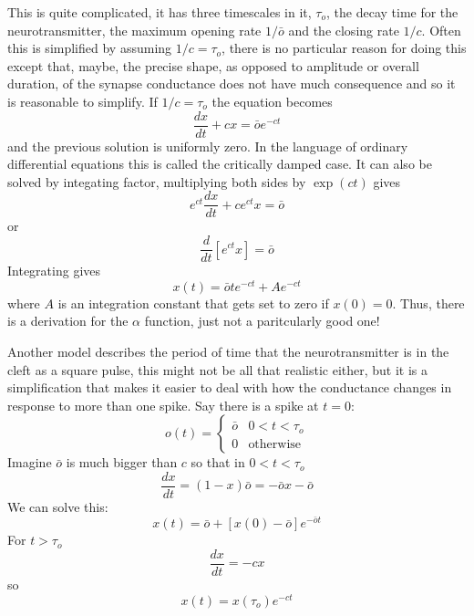 \documentclass[11pt,a4paper]{scrartcl}
\begin{document}
This is quite complicated, it has three timescales in it, $\tau_o$,
the decay time for the neurotransmitter, the maximum opening rate
$1/\bar{o}$ and the closing rate $1/c$. Often this is simplified by
assuming $1/c=\tau_o$, there is no particular reason for doing this
except that, maybe, the precise shape, as opposed to amplitude or
overall duration, of the synapse conductance does not have much
consequence and so it is reasonable to simplify. If $1/c=\tau_o$ the
equation becomes
\begin{equation}
\frac{dx}{dt}+cx=\bar{o}e^{-ct}
\end{equation}
and the previous solution is uniformly zero. In the language of
ordinary differential equations this is called the critically damped
case. It can also be solved by integating factor, multiplying both
sides by $\exp{(ct)}$ gives
\begin{equation}
e^{ct}\frac{dx}{dt}+ce^{ct}x=\bar{o}
\end{equation}
or
\begin{equation}
\frac{d}{dt}\left[e^{ct}x\right]=\bar{o}
\end{equation}
Integrating gives
\begin{equation}
x(t)=\bar{o}te^{-ct}+Ae^{-ct}
\end{equation}
where $A$ is an integration constant that gets set to zero if
$x(0)=0$. Thus, there is a derivation for the $\alpha$ function, just not a paritcularly good one!

Another model describes the period of time that the neurotransmitter
is in the cleft as a square pulse, this might not be all that
realistic either, but it is a simplification that makes it easier to
deal with how the conductance changes in response to more than one
spike. Say there is a spike at $t=0$:
\begin{equation}
o(t)=\left\{\begin{array}{ll}\bar{o}&0<t<\tau_o\\0&\mbox{otherwise}\end{array}\right.
\end{equation}
Imagine $\bar{o}$ is much bigger than $c$ so that in $0<t<\tau_o$ 
\begin{equation}
\frac{dx}{dt}=(1-x)\bar{o}=-\bar{o}x-\bar{o}
\end{equation}
We can solve this:
\begin{equation}
x(t)=\bar{o}+[x(0)-\bar{o}]e^{-\bar{o}t}
\end{equation}
For $t>\tau_o$ 
\begin{equation}
\frac{dx}{dt}=-cx
\end{equation}
so 
\begin{equation}
x(t)=x(\tau_o)e^{-ct}
\end{equation}
\end{document}
